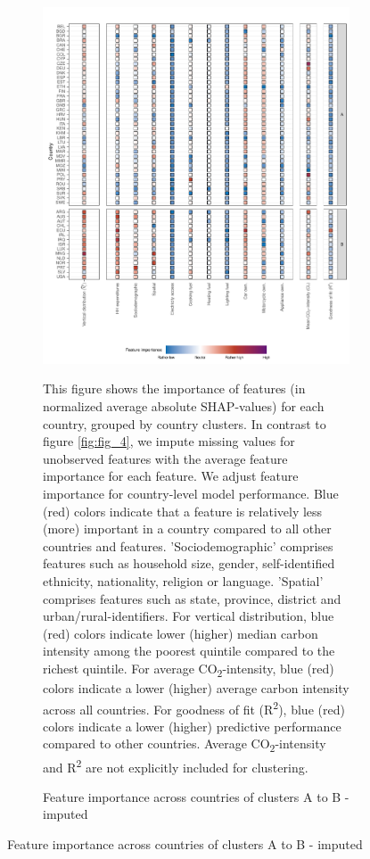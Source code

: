 \clearpage
\begin{figure}[ht!]\ContinuedFloat
    \centering
    \begin{subfigure}[b]{\textwidth}
    \centering
    \caption{Feature importance across countries of clusters A to B - imputed}\label{fig:fig_4_2_imputed}
    \includegraphics{Figure 4/Figure_4_Corrected_Imputed_1.pdf}
    \begin{subcaption2}
    This figure shows the importance of features (in normalized average absolute SHAP-values) for each country, grouped by country clusters. In contrast to figure \ref{fig:fig_4}, we impute missing values for unobserved features with the average feature importance for each feature. We adjust feature importance for country-level model performance. Blue (red) colors indicate that a feature is relatively less (more) important in a country compared to all other countries and features. 'Sociodemographic' comprises features such as household size, gender, self-identified ethnicity, nationality, religion or language. 'Spatial' comprises features such as state, province, district and urban/rural-identifiers. For vertical distribution, blue (red) colors indicate lower (higher) median carbon intensity among the poorest quintile compared to the richest quintile. For average CO\textsubscript{2}-intensity, blue (red) colors indicate a lower (higher) average carbon intensity across all countries. For goodness of fit (R\textsuperscript{2}), blue (red) colors indicate a lower (higher) predictive performance compared to other countries. Average CO\textsubscript{2}-intensity and R\textsuperscript{2} are not explicitly included for clustering.

\end{subcaption2}
\end{subfigure}
\end{figure}
